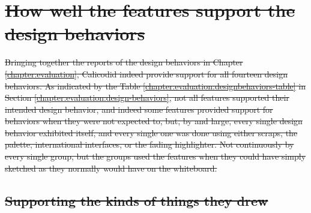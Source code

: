 \documentclass[12pt,fleqn]{ucithesis}
\providecommand{\DIFdeltex}[1]{{\protect\color{red}\sout{#1}}}                      %
\providecommand{\DIFdel}[1]{\texorpdfstring{\DIFdeltex{#1}}{}} %
\begin{document}
\section{\DIFdel{How well the features support the design behaviors}}
\addtocounter{section}{-1}%


\DIFdel{Bringing together the reports of the design behaviors in Chapter \ref{chapter:evaluation}, Calicodid indeed provide support for all fourteen design behaviors. As indicated by the Table \ref{chapter:evaluation:designbehaviors-table} in Section \ref{chapter:evaluation:design-behaviors}, not all features supported their intended design behavior, and indeed some features provided support for behaviors when they were not expected to, but, by and large, every single design behavior exhibited itself, and every single one was done using either scraps, the palette, international interfaces, or the fading highlighter. Not continuously by every single group, but the groups used the features when they could have simply sketched as they normally would have on the whiteboard. 
}%

\subsection{\DIFdel{Supporting the kinds of things they drew}}
\addtocounter{subsection}{-1}%
\end{document}
